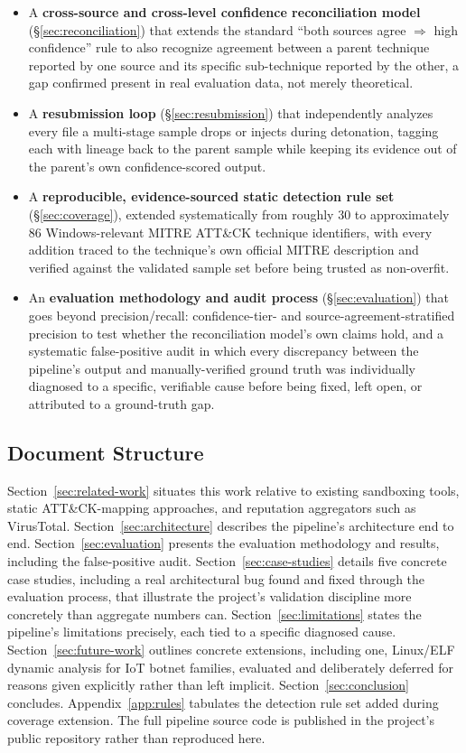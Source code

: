 \begin{itemize}
  \item A \textbf{cross-source and cross-level confidence
    reconciliation model} (\S\ref{sec:reconciliation}) that extends
    the standard ``both sources agree $\Rightarrow$ high confidence''
    rule to also recognize agreement between a parent technique
    reported by one source and its specific sub-technique reported by
    the other, a gap confirmed present in real evaluation data, not
    merely theoretical.
  \item A \textbf{resubmission loop} (\S\ref{sec:resubmission}) that
    independently analyzes every file a multi-stage sample drops or
    injects during detonation, tagging each with lineage back to the
    parent sample while keeping its evidence out of the parent's own
    confidence-scored output.
  \item A \textbf{reproducible, evidence-sourced static detection rule
    set} (\S\ref{sec:coverage}), extended systematically from roughly
    30 to approximately 86 Windows-relevant MITRE ATT\&CK technique
    identifiers, with every addition traced to the technique's own
    official MITRE description and verified against the validated
    sample set before being trusted as non-overfit.
  \item An \textbf{evaluation methodology and audit process}
    (\S\ref{sec:evaluation}) that goes beyond precision/recall:
    confidence-tier- and source-agreement-stratified precision to test
    whether the reconciliation model's own claims hold, and a
    systematic false-positive audit in which every discrepancy between
    the pipeline's output and manually-verified ground truth was
    individually diagnosed to a specific, verifiable cause before
    being fixed, left open, or attributed to a ground-truth gap.
\end{itemize}

\subsection{Document Structure}

Section~\ref{sec:related-work} situates this work relative to existing
sandboxing tools, static ATT\&CK-mapping approaches, and reputation
aggregators such as VirusTotal. Section~\ref{sec:architecture}
describes the pipeline's architecture end to end. Section~\ref{sec:evaluation}
presents the evaluation methodology and results, including the
false-positive audit. Section~\ref{sec:case-studies} details five
concrete case studies, including a real architectural bug found and
fixed through the evaluation process, that illustrate the project's
validation discipline more concretely than aggregate numbers can.
Section~\ref{sec:limitations} states the pipeline's limitations
precisely, each tied to a specific diagnosed cause.
Section~\ref{sec:future-work} outlines concrete extensions, including
one, Linux/ELF dynamic analysis for IoT botnet families, evaluated and
deliberately deferred for reasons given explicitly rather than left
implicit. Section~\ref{sec:conclusion} concludes.
Appendix~\ref{app:rules} tabulates the detection rule set added during
coverage extension. The full pipeline source code is published in the
project's public repository rather than reproduced here.
